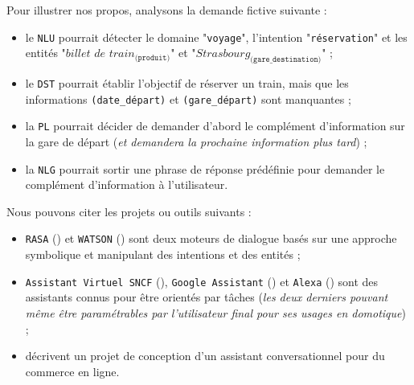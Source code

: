 			\begin{leftBarExamples}
				Pour illustrer nos propos, analysons la demande fictive suivante :
				\begin{quote}
					\begin{center}
					\end{center}
				\end{quote}
				\begin{itemize}
					\item le \texttt{NLU} pourrait détecter le domaine "\texttt{voyage}", l'intention "\texttt{réservation}" et les entités "$\textit{billet de train}_{\texttt{(produit)}}$" et "$\textit{Strasbourg}_{\texttt{(gare\_destination)}}$" ;
					\item le \texttt{DST} pourrait établir l'objectif de réserver un train, mais que les informations \texttt{(date\_départ)} et \texttt{(gare\_départ)} sont manquantes ;
					\item la \texttt{PL} pourrait décider de demander d'abord le complément d'information sur la gare de départ (\textit{et demandera la prochaine information plus tard}) ;
					\item la \texttt{NLG} pourrait sortir une phrase de réponse prédéfinie pour demander le complément d'information à l'utilisateur.
				\end{itemize}
			\end{leftBarExamples}
				
			\begin{leftBarExamples}
				Nous pouvons citer les projets ou outils suivants :
				\begin{itemize}
					\item \texttt{RASA} (\cite{bocklisch-etal:2017:rasa-open-source}) et \texttt{WATSON} (\cite{hoyt-etal:2016:ibm-watson-analytics}) sont deux moteurs de dialogue basés sur une approche symbolique et manipulant des intentions et des entités ;
					\item \texttt{Assistant Virtuel SNCF} (\cite{sncf:2018:agent-virtuel-sncf}), \texttt{Google Assistant} (\cite{google:2016:google-assistant-your}) et \texttt{Alexa} (\cite{alexa-internet:2018:keyword-research-competitor}) sont des assistants connus pour être orientés par tâches (\textit{les deux derniers pouvant même être paramétrables par l'utilisateur final pour ses usages en domotique}) ;
					\item \cite{yan-etal:2017:building-taskoriented-dialogue} décrivent un projet de conception d'un assistant conversationnel pour du commerce en ligne.
				\end{itemize}
			\end{leftBarExamples}
		
